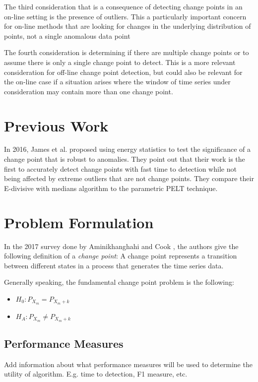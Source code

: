 The third consideration that is a consequence of detecting change points in an on-line setting is the presence of outliers. This a particularly important concern for on-line methods that are looking for changes in the underlying distribution of points, not a single anomalous data point

The fourth consideration is determining if there are multiple change points or to assume there is only a single change point to detect. This is a more relevant consideration for off-line change point detection, but could also be relevant for the on-line case if a situation arises where the window of time series under consideration may contain more than one change point.

\section{Previous Work}


In 2016, James et al. \cite{james2016leveraging} proposed using energy statistics to test the significance of a change point that is robust to anomalies. They point out that their work is the first to accurately detect change points with fast time to detection while not being affected by extreme outliers that are not change points. They compare their E-divisive with medians algorithm to the parametric PELT technique. 

\section{Problem Formulation}
In the 2017 survey done by Aminikhanghahi and Cook \cite{aminikhanghahi2017survey}, the authors give the following definition of a \textit{change point}:
A change point represents a transition between different states in a process that generates the time series data.

Generally speaking, the fundamental change point problem is the following:
\begin{itemize}
  \item $H_0: P_{X_m }=  P_{X_m+k} $
  \item $H_A: P_{X_m} \neq  P_{X_m+k} $
\end{itemize}

\subsection{Performance Measures}
Add information about what performance measures will be used to determine the utility of algorithm. E.g. time to detection, F1 measure, etc.

